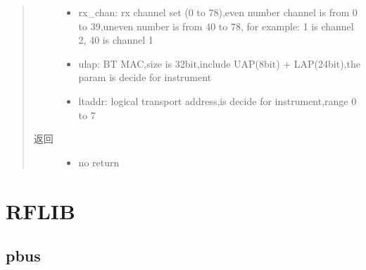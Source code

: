 \documentclass[letterpaper,10pt,english]{sphinxhowto}
\begin{document}
\begin{fulllineitems}
\begin{fulllineitems}
\begin{quote}
\begin{description}
\begin{itemize}
\begin{description}
\end{description}

\item {} 
rx\_chan: rx channel set (0 to 78),even number channel is from 0 to 39,uneven number is from 40 to 78, for example: 1 is channel 2, 40 is channel 1

\item {} 
ulap: BT MAC,size is 32bit,include UAP(8bit) + LAP(24bit),the param is decide for instrument

\item {} 
ltaddr: logical transport address,is decide for instrument,range 0 to 7

\end{itemize}

\item[{返回}] \leavevmode
\begin{itemize}
\item {} 
no return

\end{itemize}


\end{description}\end{quote}

\end{fulllineitems}


\end{fulllineitems}



\section{RFLIB}
\label{\detokenize{rflib/index:rflib}}\label{\detokenize{rflib/index::doc}}

\subsection{pbus}
\label{\detokenize{rflib/index:module-pbus}}\label{\detokenize{rflib/index:pbus}}
\end{document}
